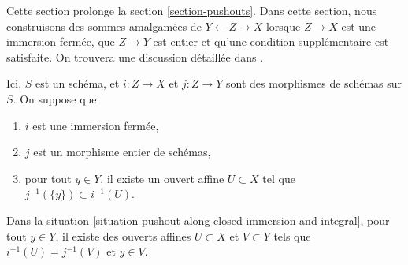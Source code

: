 \noindent
Cette section prolonge la section \ref{section-pushouts}.
Dans cette section, nous construisons des sommes amalgamées de $Y \leftarrow Z \rightarrow X$
lorsque $Z \to X$ est une immersion fermée, que $Z \to Y$ est entier et
qu'une condition supplémentaire est satisfaite.
On trouvera une discussion détaillée dans \cite{Ferrand-Conducteur}.

\begin{situation}
\label{situation-pushout-along-closed-immersion-and-integral}
Ici, $S$ est un schéma, et $i : Z \to X$ et $j : Z \to Y$
sont des morphismes de schémas sur $S$. On suppose que
\begin{enumerate}
\item $i$ est une immersion fermée,
\item $j$ est un morphisme entier de schémas,
\item pour tout $y \in Y$, il existe un ouvert affine $U \subset X$
tel que $j^{-1}(\{y\}) \subset i^{-1}(U)$.
\end{enumerate}
\end{situation}

\begin{lemma}
\label{lemma-prepare-pushout-along-closed-immersion-and-integral}
Dans la situation \ref{situation-pushout-along-closed-immersion-and-integral},
pour tout $y \in Y$, il existe des ouverts affines $U \subset X$ et
$V \subset Y$ tels que $i^{-1}(U) = j^{-1}(V)$ et $y \in V$.
\end{lemma}

